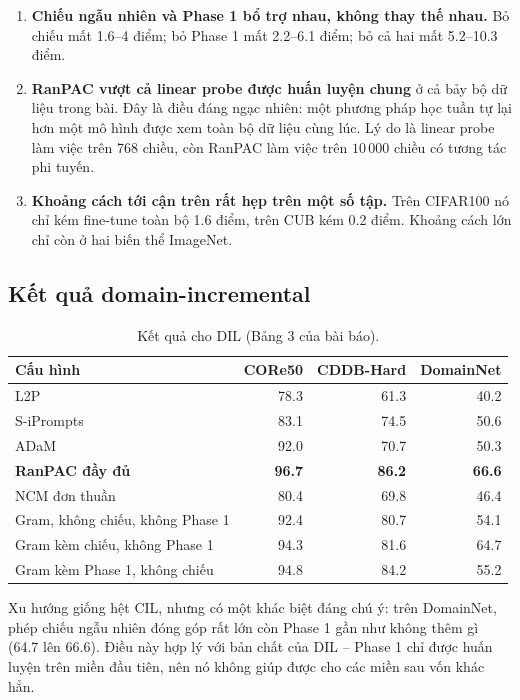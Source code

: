 \documentclass[11pt,a4paper]{article}
\begin{document}
\begin{enumerate}[leftmargin=*]
\item \textbf{Chiếu ngẫu nhiên và Phase 1 bổ trợ nhau, không thay thế nhau.} Bỏ
      chiếu mất 1.6--4 điểm; bỏ Phase 1 mất 2.2--6.1 điểm; bỏ cả hai mất
      5.2--10.3 điểm.
\item \textbf{RanPAC vượt cả linear probe được huấn luyện chung} ở cả bảy bộ dữ
      liệu trong bài. Đây là điều đáng ngạc nhiên: một phương pháp học tuần tự
      lại hơn một mô hình được xem toàn bộ dữ liệu cùng lúc. Lý do là linear probe
      làm việc trên 768 chiều, còn RanPAC làm việc trên $10\,000$ chiều có tương
      tác phi tuyến.
\item \textbf{Khoảng cách tới cận trên rất hẹp trên một số tập.} Trên CIFAR100 nó
      chỉ kém fine-tune toàn bộ 1.6 điểm, trên CUB kém 0.2 điểm. Khoảng cách lớn
      chỉ còn ở hai biến thể ImageNet.
\end{enumerate}

\subsection{Kết quả domain-incremental}

\begin{table}[htbp]
\centering
\caption{Kết quả cho DIL (Bảng 3 của bài báo).}
\label{tab:dil}
\begin{tabular}{lrrr}
\toprule
Cấu hình & CORe50 & CDDB-Hard & DomainNet \\
\midrule
L2P                                & 78.3 & 61.3 & 40.2 \\
S-iPrompts                         & 83.1 & 74.5 & 50.6 \\
ADaM                               & 92.0 & 70.7 & 50.3 \\
\midrule
\textbf{RanPAC đầy đủ}             & \textbf{96.7} & \textbf{86.2} & \textbf{66.6} \\
\midrule
NCM đơn thuần                      & 80.4 & 69.8 & 46.4 \\
Gram, không chiếu, không Phase 1   & 92.4 & 80.7 & 54.1 \\
Gram kèm chiếu, không Phase 1      & 94.3 & 81.6 & 64.7 \\
Gram kèm Phase 1, không chiếu      & 94.8 & 84.2 & 55.2 \\
\bottomrule
\end{tabular}
\end{table}

Xu hướng giống hệt CIL, nhưng có một khác biệt đáng chú ý: trên DomainNet, phép
chiếu ngẫu nhiên đóng góp rất lớn còn Phase 1 gần như không thêm gì (64.7 lên
66.6). Điều này hợp lý với bản chất của DIL -- Phase 1 chỉ được huấn luyện trên
miền đầu tiên, nên nó không giúp được cho các miền sau vốn khác hẳn.
\end{document}
